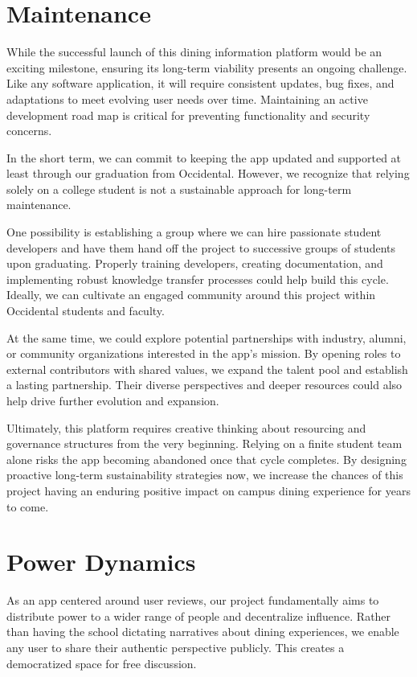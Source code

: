\documentclass[10pt,twocolumn]{article}
\begin{document}
\section{Maintenance}

While the successful launch of this dining information platform would be an exciting milestone, ensuring its long-term viability presents an ongoing challenge. Like any software application, it will require consistent updates, bug fixes, and adaptations to meet evolving user needs over time. Maintaining an active development road map is critical for preventing functionality and security concerns.

In the short term, we can commit to keeping the app updated and supported at least through our graduation from Occidental. However, we recognize that relying solely on a college student is not a sustainable approach for long-term maintenance. 

One possibility is establishing a group where we can hire passionate student developers and have them hand off the project to successive groups of students upon graduating. Properly training developers, creating documentation, and implementing robust knowledge transfer processes could help build this cycle. Ideally, we can cultivate an engaged community around this project within Occidental students and faculty.

At the same time, we could explore potential partnerships with industry, alumni, or community organizations interested in the app's mission. By opening roles to external contributors with shared values, we expand the talent pool and establish a lasting partnership. Their diverse perspectives and deeper resources could also help drive further evolution and expansion.

Ultimately, this platform requires creative thinking about resourcing and governance structures from the very beginning. Relying on a finite student team alone risks the app becoming abandoned once that cycle completes. By designing proactive long-term sustainability strategies now, we increase the chances of this project having an enduring positive impact on campus dining experience for years to come.



\section{Power Dynamics}
As an app centered around user reviews, our project fundamentally aims to distribute power to a wider range of people and decentralize influence. Rather than having the school dictating narratives about dining experiences, we enable any user to share their authentic perspective publicly. This creates a democratized space for free discussion.
\end{document}
